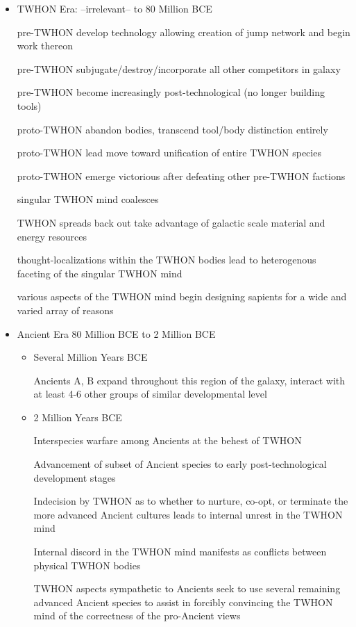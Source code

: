 \begin{itemize}
\item TWHON Era: --irrelevant-- to 80 Million BCE

pre-TWHON develop technology allowing creation of jump network and
begin work thereon

pre-TWHON subjugate/destroy/incorporate all other competitors in
galaxy

pre-TWHON become increasingly post-technological (no longer building
tools)

proto-TWHON abandon bodies, transcend tool/body distinction entirely

proto-TWHON lead move toward unification of entire TWHON species

proto-TWHON emerge victorious after defeating other pre-TWHON factions

singular TWHON mind coalesces

TWHON spreads back out take advantage of galactic scale material and
energy resources

thought-localizations within the TWHON bodies lead to heterogenous
faceting of the singular TWHON mind

various aspects of the TWHON mind begin designing sapients for a wide
and varied array of reasons

\item Ancient Era 80 Million BCE to 2 Million BCE
\begin{itemize}
\item	Several Million Years BCE 

Ancients A, B expand throughout this region of the galaxy, interact
with at least 4-6 other groups of similar developmental level

\item 2 Million Years BCE 

Interspecies warfare among Ancients at the behest of TWHON

Advancement of subset of Ancient species to early post-technological
development stages

Indecision by TWHON as to whether to nurture, co-opt, or terminate the
more advanced Ancient cultures leads to internal unrest in the TWHON
mind

Internal discord in the TWHON mind manifests as conflicts between
physical TWHON bodies

TWHON aspects sympathetic to Ancients seek to use several remaining
advanced Ancient species to assist in forcibly convincing the TWHON
mind of the correctness of the pro-Ancient views


\end{itemize}
\end{itemize}
